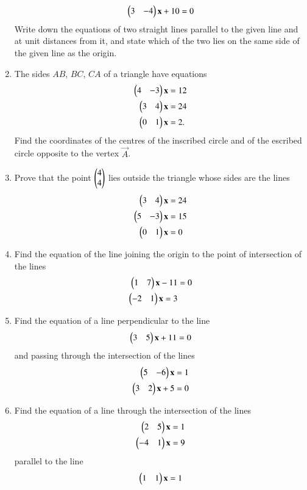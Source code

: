 \begin{enumerate}[label=\arabic*.,ref=\thesubsection.\theenumi]
\begin{align}
\begin{pmatrix}3 &-4\end{pmatrix}\mathbf{x}+10 = 0
\end{align}
Write down the equations of two straight lines parallel to the given line and at unit distances from it,
and state which of the two lies on the same side of the given line as the origin.
\item The sides $AB$, $BC$, $CA$ of a triangle have equations
\begin{align}
\begin{pmatrix}4&-3\end{pmatrix} \mathbf{x}&= 12
\\
\begin{pmatrix} 3 &4\end{pmatrix} \mathbf{x}&= 24
\\
\begin{pmatrix}0 & 1\end{pmatrix} \mathbf{x}&= 2.
\end{align}
Find the coordinates of the centres of the inscribed circle and of the escribed circle opposite to the vertex $\vec{A}$.
\item Prove that the point $\begin{pmatrix}4\\4\end{pmatrix}$ lies outside the triangle whose sides are the lines
\begin{align}
\begin{pmatrix}3&4\end{pmatrix} \mathbf{x}&= 24
\\
\begin{pmatrix} 5 & - 3\end{pmatrix} \mathbf{x}&= 15
\\
\begin{pmatrix}0 &1\end{pmatrix} \mathbf{x}&= 0
\end{align}
\item Find the equation of the line joining the origin to the point of intersection of the lines
\begin{align}
\begin{pmatrix}1&7\end{pmatrix}\mathbf{x} - 11 &= 0
\\
\begin{pmatrix}-2 & 1\end{pmatrix} \mathbf{x}= 3
\end{align}
\item Find the equation of a line perpendicular to the line
\begin{align}
\begin{pmatrix}3&5\end{pmatrix}\mathbf{x}+11 = 0
\end{align}
and passing through the intersection of the lines
\begin{align}
\begin{pmatrix}5 & - 6\end{pmatrix} \mathbf{x}&= 1
\\
\begin{pmatrix} 3&2\end{pmatrix}\mathbf{x}+5 &= 0
\end{align}
\item Find the equation of a line through the intersection of the lines
\begin{align}
\begin{pmatrix}2&5\end{pmatrix} \mathbf{x}&= 1
\\
\begin{pmatrix}-4 & 1\end{pmatrix} \mathbf{x}&= 9
\end{align}
parallel to the line 
\begin{align}
\begin{pmatrix}1 & 1\end{pmatrix} \mathbf{x}= 1
\end{align}
\renewcommand{\theequation}{\theenumi}

\end{enumerate}
